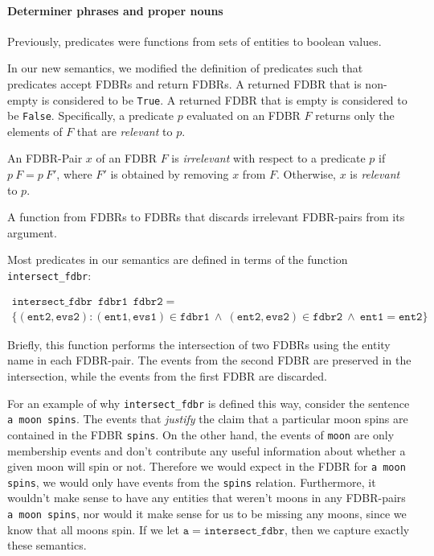 \documentclass[../main.tex]{subfiles}
\begin{document}
\paragraph{Determiner phrases and proper nouns}
Previously, predicates were functions from sets of entities to boolean values.

In our new semantics, we modified the definition of predicates such that predicates accept FDBRs and return FDBRs.
A returned FDBR that is non-empty is considered to be \texttt{True}.  A returned FDBR that is empty is considered to be \texttt{False}.
Specifically, a predicate $p$ evaluated on an FDBR $F$ returns only the elements of $F$ that are {\em relevant} to $p$.

\begin{definition}
	An FDBR-Pair $x$ of an FDBR $F$ is {\em irrelevant} with respect to a predicate $p$ if $p\ F = p\ F'$, where $F'$ is obtained by removing $x$ from $F$.  Otherwise,
	$x$ is {\em relevant} to $p$.
\end{definition}

\begin{definition}[Predicate]
	A function from FDBRs to FDBRs that discards irrelevant FDBR-pairs from its argument.
\end{definition}

Most predicates in our semantics are defined in terms of the function \texttt{intersect\_fdbr}:

\begin{definition}
	\begin{multline*}
	\mathtt{intersect\_fdbr}\enspace \mathtt{fdbr1}\enspace \mathtt{fdbr2} = \\ \{\mathtt{(ent2, evs2) : (ent1, evs1) }\in \mathtt{fdbr1 \ \wedge\ (ent2, evs2) } \in \mathtt{fdbr2\ \wedge\ ent1 = ent2}\}
	\end{multline*}
\end{definition}

Briefly, this function performs the intersection of two FDBRs using the entity name in each FDBR-pair.  The events from the second FDBR are preserved
in the intersection, while the events from the first FDBR are discarded.

For an example of why \texttt{intersect\_fdbr} is defined this way, consider the sentence
\texttt{a moon spins}.  The events that {\em justify} the claim that a particular moon spins are contained in the FDBR \texttt{spins}.  On the other hand, the events of \texttt{moon}
are only membership events and don't contribute any useful information about whether a given moon will spin or not.  Therefore we would expect in the FDBR for \texttt{a moon spins},
we would only have events from the \texttt{spins} relation.  Furthermore, it wouldn't make sense to have any entities that weren't moons in any FDBR-pairs \texttt{a moon spins}, nor would
it make sense for us to be missing any moons, since we know that all moons spin.  If we let $\mathtt{a} = \mathtt{intersect\_fdbr}$, then we capture exactly these semantics.
\end{document}

